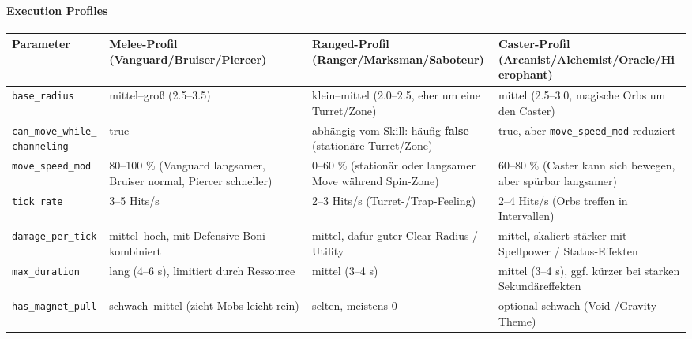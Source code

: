 \paragraph{Execution Profiles}{}
\scriptsize %
\begin{tabular}{p{3cm} | p{4cm} | p{4cm} | p{4cm}}
	Parameter               & Melee-Profil (Vanguard/Bruiser/Piercer)                    & Ranged-Profil (Ranger/Marksman/Saboteur)                               & Caster-Profil (Arcanist/Alchemist/Oracle/Hierophant)                   \\
	\hline
	\texttt{base\_radius}           & mittel–groß (2.5–3.5)                                      & klein–mittel (2.0–2.5, eher um eine Turret/Zone)                       & mittel (2.5–3.0, magische Orbs um den Caster)                          \\
	\texttt{can\_move\_while\_channeling} & true                                                  & abhängig vom Skill: häufig \textbf{false} (stationäre Turret/Zone)          & true, aber \texttt{move\_speed\_mod} reduziert                                  \\
	\texttt{move\_speed\_mod}        & 80–100 \% (Vanguard langsamer, Bruiser normal, Piercer schneller) & 0–60 \% (stationär oder langsamer Move während Spin-Zone)          & 60–80 \% (Caster kann sich bewegen, aber spürbar langsamer)             \\
	\texttt{tick\_rate}             & 3–5 Hits/s                                                 & 2–3 Hits/s (Turret-/Trap-Feeling)                                      & 2–4 Hits/s (Orbs treffen in Intervallen)                               \\
	\texttt{damage\_per\_tick}       & mittel–hoch, mit Defensive-Boni kombiniert                & mittel, dafür guter Clear-Radius / Utility                             & mittel, skaliert stärker mit Spellpower / Status-Effekten              \\
	\texttt{max\_duration}          & lang (4–6 s), limitiert durch Ressource                    & mittel (3–4 s)                                                         & mittel (3–4 s), ggf. kürzer bei starken Sekundäreffekten               \\
	\texttt{has\_magnet\_pull}       & schwach–mittel (zieht Mobs leicht rein)                    & selten, meistens 0                                                     & optional schwach (Void-/Gravity-Theme)                                 \\
	\hline
\end{tabular}
\normalsize
